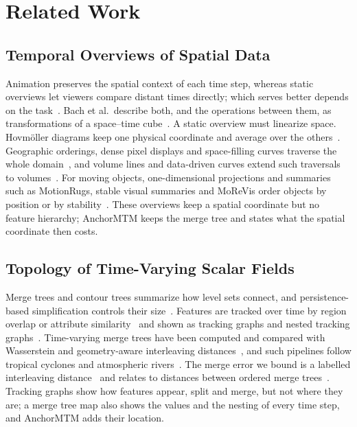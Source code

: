 \documentclass[preprint]{vgtc}   %
\begin{document}
\section{Related Work}\label{sec:related}
\subsection{Temporal Overviews of Spatial Data}
Animation preserves the spatial context of each time step, whereas static overviews let viewers compare distant times directly; which serves better depends on the task~\cite{Tversky:2002:Animation,Robertson:2008:Animation}. Bach et al.\ describe both, and the operations between them, as transformations of a space--time cube~\cite{Bach:2017:STC}. A static overview must linearize space. Hovm\"oller diagrams keep one physical coordinate and average over the others~\cite{Hovmoller:1949}. Geographic orderings, dense pixel displays and space-filling curves traverse the whole domain~\cite{Guo:2006:SpatialOrder,Dafner:2000:CSFC,Rauscher:2025:1DO}, and volume lines and data-driven curves extend such traversals to volumes~\cite{Weissenboeck:2019:DVL,Zhou:2021:DSF}. For moving objects, one-dimensional projections and summaries such as MotionRugs, stable visual summaries and MoReVis order objects by position or by stability~\cite{Franke:2021:1DP,Buchmueller:2019:MR,Wulms:2021:SVS,Valdrighi:2024:MRV}. These overviews keep a spatial coordinate but no feature hierarchy; AnchorMTM keeps the merge tree and states what the spatial coordinate then costs.

\subsection{Topology of Time-Varying Scalar Fields}
Merge trees and contour trees summarize how level sets connect, and persistence-based simplification controls their size~\cite{Heine:2016:Survey,Edelsbrunner:2002:TPS,Tierny:2018:TTK}. Features are tracked over time by region overlap or attribute similarity~\cite{Silver:1997:Tracking,Saikia:2017:GFT} and shown as tracking graphs and nested tracking graphs~\cite{Widanagamaachchi:2012:DTG,Lukasczyk:2017:NTG,Lukasczyk:2020:DNTG}. Time-varying merge trees have been computed and compared with Wasserstein and geometry-aware interleaving distances~\cite{Oesterling:2017:TVMT,Pont:2022:WMT,Yan:2022:GAMT,Yan:2021:Survey}, and such pipelines follow tropical cyclones and atmospheric rivers~\cite{Yan:2024:TROPHY,Lan:2024:AR}. The merge error we bound is a labelled interleaving distance~\cite{Munch:2019:LINF,Gasparovic:2024:IID,Morozov:2013:IDMT} and relates to distances between ordered merge trees~\cite{Beurskens:2025:OMT}. Tracking graphs show how features appear, split and merge, but not where they are; a merge tree map also shows the values and the nesting of every time step, and AnchorMTM adds their location.
\end{document}
